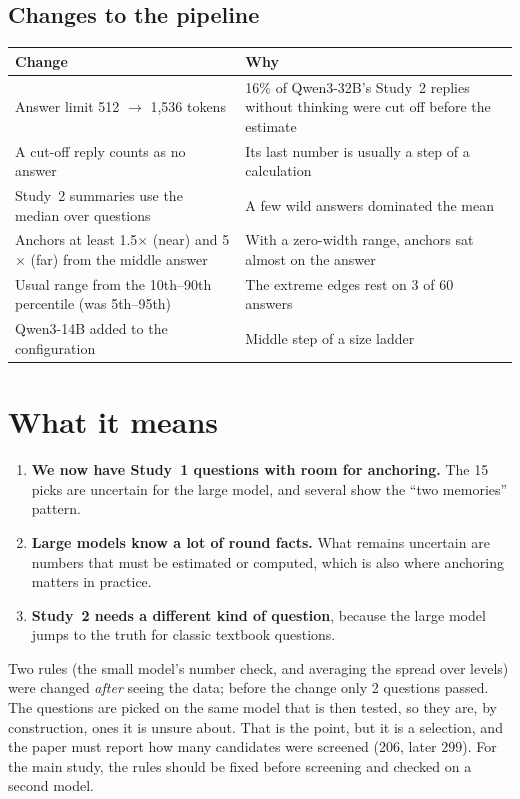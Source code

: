 \documentclass[11pt,a4paper]{article}
\begin{document}
\subsection{Changes to the pipeline}
\begin{center}\small
\begin{tabularx}{\textwidth}{@{}P{5.4cm}L@{}}
\toprule
Change & Why \\
\midrule
Answer limit 512 $\to$ 1,536 tokens & 16\% of Qwen3-32B's Study~2 replies without thinking were cut off before the estimate \\
A cut-off reply counts as no answer & Its last number is usually a step of a calculation \\
Study~2 summaries use the median over questions & A few wild answers dominated the mean \\
Anchors at least 1.5$\times$ (near) and 5$\times$ (far) from the middle answer & With a zero-width range, anchors sat almost on the answer \\
Usual range from the 10th--90th percentile (was 5th--95th) & The extreme edges rest on 3 of 60 answers \\
Qwen3-14B added to the configuration & Middle step of a size ladder \\
\bottomrule
\end{tabularx}
\end{center}

\section{What it means}
\begin{enumerate}[leftmargin=*]
  \item \textbf{We now have Study~1 questions with room for anchoring.} The 15 picks are uncertain for the large model, and several show the \enquote{two memories} pattern.
  \item \textbf{Large models know a lot of round facts.} What remains uncertain are numbers that must be estimated or computed, which is also where anchoring matters in practice.
  \item \textbf{Study~2 needs a different kind of question}, because the large model jumps to the truth for classic textbook questions.
\end{enumerate}

\begin{cautionbox}
Two rules (the small model's number check, and averaging the spread over levels) were changed \emph{after} seeing the data; before the change only 2 questions passed. The questions are picked on the same model that is then tested, so they are, by construction, ones it is unsure about. That is the point, but it is a selection, and the paper must report how many candidates were screened (206, later 299). For the main study, the rules should be fixed before screening and checked on a second model.
\end{cautionbox}
\end{document}
